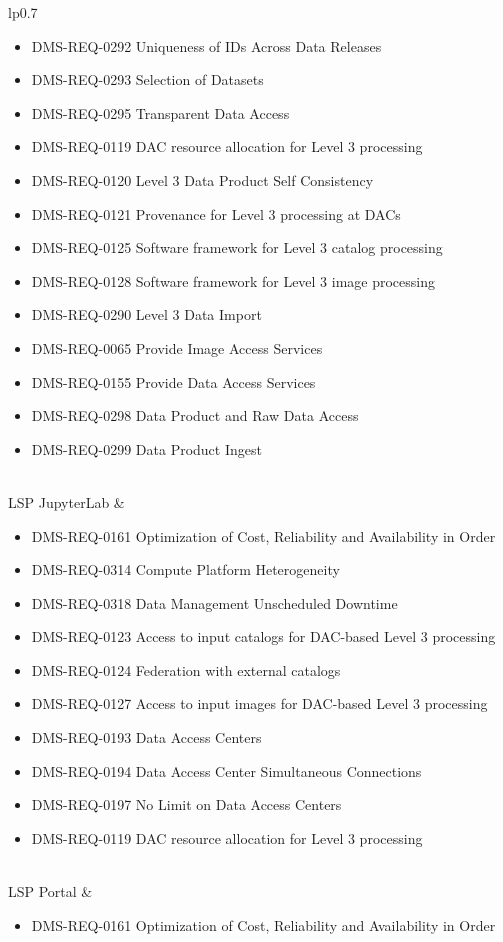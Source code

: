 \begin{xtabular}{lp{0.7\textwidth}}
\begin{itemize}
\item DMS-REQ-0292 Uniqueness of IDs Across Data Releases
\item DMS-REQ-0293 Selection of Datasets
\item DMS-REQ-0295 Transparent Data Access
\item DMS-REQ-0119 DAC resource allocation for Level 3 processing
\item DMS-REQ-0120 Level 3 Data Product Self Consistency
\item DMS-REQ-0121 Provenance for Level 3 processing at DACs
\item DMS-REQ-0125 Software framework for Level 3 catalog processing
\item DMS-REQ-0128 Software framework for Level 3 image processing
\item DMS-REQ-0290 Level 3 Data Import
\item DMS-REQ-0065 Provide Image Access Services
\item DMS-REQ-0155 Provide Data Access Services
\item DMS-REQ-0298 Data Product and Raw Data Access
\item DMS-REQ-0299 Data Product Ingest
\end{itemize} \\ \hline
LSP JupyterLab &
\begin{itemize}
\item DMS-REQ-0161 Optimization of Cost, Reliability and Availability in Order
\item DMS-REQ-0314 Compute Platform Heterogeneity
\item DMS-REQ-0318 Data Management Unscheduled Downtime
\item DMS-REQ-0123 Access to input catalogs for DAC-based Level 3 processing
\item DMS-REQ-0124 Federation with external catalogs
\item DMS-REQ-0127 Access to input images for DAC-based Level 3 processing
\item DMS-REQ-0193 Data Access Centers
\item DMS-REQ-0194 Data Access Center Simultaneous Connections
\item DMS-REQ-0197 No Limit on Data Access Centers
\item DMS-REQ-0119 DAC resource allocation for Level 3 processing
\end{itemize} \\ \hline
LSP Portal &
\begin{itemize}
\item DMS-REQ-0161 Optimization of Cost, Reliability and Availability in Order

\end{itemize}
\end{xtabular}
